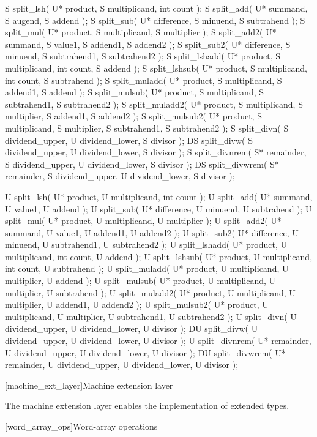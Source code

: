 \begin{itemdecl}
S split_lsh( U* product, S multiplicand, int count );
S split_add( U* summand, S augend, S addend );
S split_sub( U* difference, S minuend, S subtrahend );
S split_mul( U* product, S multiplicand, S multiplier );
S split_add2( U* summand, S value1, S addend1, S addend2 );
S split_sub2( U* difference, S minuend, S subtrahend1, S subtrahend2 );
S split_lshadd( U* product, S multiplicand, int count, S addend );
S split_lshsub( U* product, S multiplicand, int count, S subtrahend );
S split_muladd( U* product, S multiplicand, S addend1, S addend );
S split_mulsub( U* product, S multiplicand, S subtrahend1, S subtrahend2 );
S split_muladd2( U* product, S multiplicand, S multiplier, S addend1, S addend2 );
S split_mulsub2( U* product, S multiplicand, S multiplier, S subtrahend1, S subtrahend2 );
S split_divn( S dividend_upper, U dividend_lower, S divisor );
DS split_divw( S dividend_upper, U dividend_lower, S divisor );
S split_divnrem( S* remainder, S dividend_upper, U dividend_lower, S divisor );
DS split_divwrem( S* remainder, S dividend_upper, U dividend_lower, S divisor );

U split_lsh( U* product, U multiplicand, int count );
U split_add( U* summand, U value1, U addend );
U split_sub( U* difference, U minuend, U subtrahend );
U split_mul( U* product, U multiplicand, U multiplier );
U split_add2( U* summand, U value1, U addend1, U addend2 );
U split_sub2( U* difference, U minuend, U subtrahend1, U subtrahend2 );
U split_lshadd( U* product, U multiplicand, int count, U addend );
U split_lshsub( U* product, U multiplicand, int count, U subtrahend );
U split_muladd( U* product, U multiplicand, U multiplier, U addend );
U split_mulsub( U* product, U multiplicand, U multiplier, U subtrahend );
U split_muladd2( U* product, U multiplicand, U multiplier, U addend1, U addend2 );
U split_mulsub2( U* product, U multiplicand, U multiplier, U subtrahend1, U subtrahend2 );
U split_divn( U dividend_upper, U dividend_lower, U divisor );
DU split_divw( U dividend_upper, U dividend_lower, U divisor );
U split_divnrem( U* remainder, U dividend_upper, U dividend_lower, U divisor );
DU split_divwrem( U* remainder, U dividend_upper, U dividend_lower, U divisor );		
\end{itemdecl}

[machine_ext_layer]{Machine extension layer}

The machine extension layer enables the implementation of extended types.

[word_array_ops]{Word-array operations}

